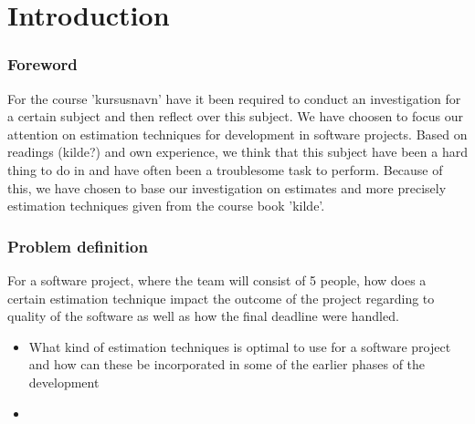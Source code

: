 \part{Introduction}
\section{Foreword}
For the course 'kursusnavn' have it been required to conduct an investigation for a certain subject and then reflect over this subject. We have choosen to focus our attention on estimation techniques for development in software projects. Based on readings (kilde?) and own experience, we think that this subject have been a hard thing to do in and have often been a  troublesome task to perform. Because of this, we have chosen to base our investigation on estimates and more precisely estimation techniques given from the course book 'kilde'. 

\section{Problem definition}
For a software project, where the team will consist of 5 people, how does a certain estimation technique impact the outcome of the project regarding to quality of the software as well as how the final deadline were handled. 
\begin{itemize}
\item What kind of estimation techniques is optimal to use for a software project and how can these be incorporated in some of the earlier phases of the development
\item 
\end{itemize}
